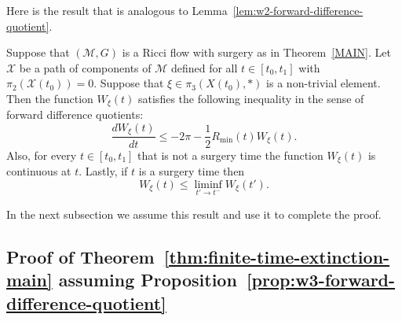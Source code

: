 Here is the result that is analogous to Lemma~\ref{lem:w2-forward-difference-quotient}.


\begin{proposition}
\label{prop:w3-forward-difference-quotient}
\label{W_3fordiff}
Suppose that $({\mathcal M},G)$ is a Ricci flow with surgery as in
Theorem~\ref{MAIN}. Let ${\mathcal X}$ be a path of components of ${\mathcal
M}$ defined for all $t\in[t_0,t_1]$ with $\pi_2({\mathcal X}(t_0))=0$. Suppose
that $\xi\in \pi_3( X(t_0),*)$ is a non-trivial element. Then the function
$W_\xi(t)$ satisfies the following inequality in the sense of forward
difference quotients:
$$\frac{d W_\xi(t)}{dt}\le -2\pi-\frac{1}{2}R_\mathrm{min}(t)W_\xi(t).$$ Also, for every $t\in [t_0,t_1]$ that is not a
surgery time the function $W_\xi(t)$ is continuous at $t$. Lastly,
if $t$ is a surgery time then
$$W_\xi(t)\le \liminf_{t'\rightarrow t^-}W_\xi(t').$$
\end{proposition}

In the next subsection we assume this result and use it to complete
the proof.



\subsection{Proof of Theorem~{\ref{thm:finite-time-extinction-main}} assuming
Proposition~{\ref{prop:w3-forward-difference-quotient}}}

